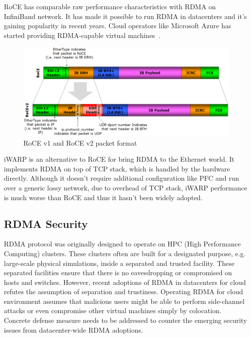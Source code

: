 RoCE has comparable raw performance characteristics with RDMA on InfiniBand
network. It has made it possible to run RDMA in datacenters and it's gaining
popularity in recent years. Cloud operators like Microsoft Azure has started
providing RDMA-capable virtual machines~\cite{news:azure.rdma}.

\begin{figure}[ht]
    \centering
    \includegraphics[width=\textwidth]{fig/RoCE_Header_format}
    \caption{RoCE v1 and RoCE v2 packet format}
    \label{fig:roce_header_format}
\end{figure}

iWARP is an alternative to RoCE for bring RDMA to the Ethernet world. It
implements RDMA on top of TCP stack, which is handled by the hardware directly.
Although it doesn't require additional configuration like PFC and run over a
generic lossy network, due to overhead of TCP stack, iWARP performance is much
worse than RoCE and thus it hasn't been widely adopted.

\subsection{RDMA Security}

RDMA protocol was originally designed to operate on HPC (High Performance Computing) clusters.
These clusters often are built for a designated purpose, e.g. large-scale physical simulations,
inside a separated and trusted facility. These separated facilities ensure that there is no eavesdropping or compromised on hosts and switches. However, recent adoptions of RDMA in datacenters for cloud refutes the assumption of separation and trustiness. Operating RDMA for cloud environment assumes that malicious users might be able to perform side-channel attacks or even compromise other virtual machines simply by colocation.
Concrete defense measure needs to be addressed to counter the emerging security issues from datacenter-wide RDMA adoptions.

